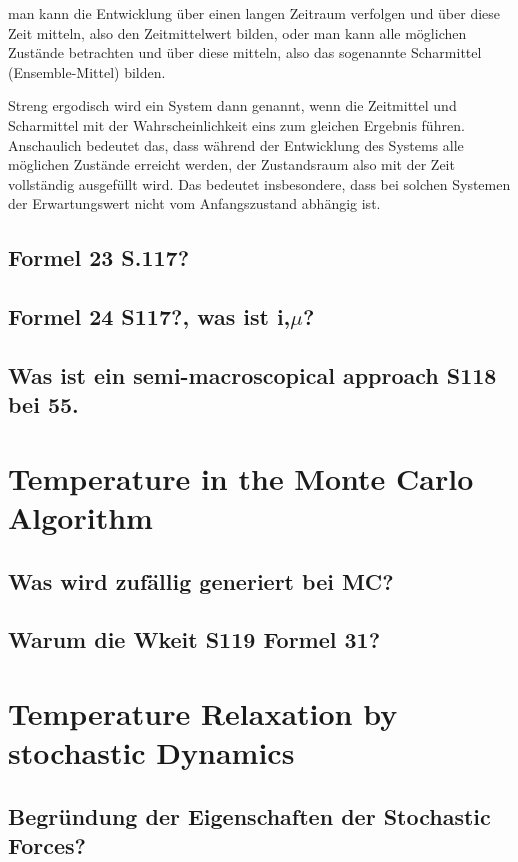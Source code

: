 \documentclass[]{article}
\begin{document}
man kann die Entwicklung über einen langen Zeitraum verfolgen und über diese Zeit mitteln, also den Zeitmittelwert bilden, oder
man kann alle möglichen Zustände betrachten und über diese mitteln, also das sogenannte Scharmittel (Ensemble-Mittel) bilden.

Streng ergodisch wird ein System dann genannt, wenn die Zeitmittel und Scharmittel mit der Wahrscheinlichkeit eins zum gleichen Ergebnis führen. Anschaulich bedeutet das, dass während der Entwicklung des Systems alle möglichen Zustände erreicht werden, der Zustandsraum also mit der Zeit vollständig ausgefüllt wird. Das bedeutet insbesondere, dass bei solchen Systemen der Erwartungswert nicht vom Anfangszustand abhängig ist.

\subsection{Formel 23 S.117?}

\subsection{Formel 24 S117?, was ist i,$\mu$?}

\subsection{Was ist ein semi-macroscopical approach S118 bei 55.}

\section{Temperature in the Monte Carlo Algorithm}

\subsection{Was wird zufällig generiert bei MC?}

\subsection{Warum die Wkeit S119 Formel 31?}

\section{Temperature Relaxation by stochastic Dynamics}

\subsection{Begründung der Eigenschaften der Stochastic Forces?}
\end{document}

